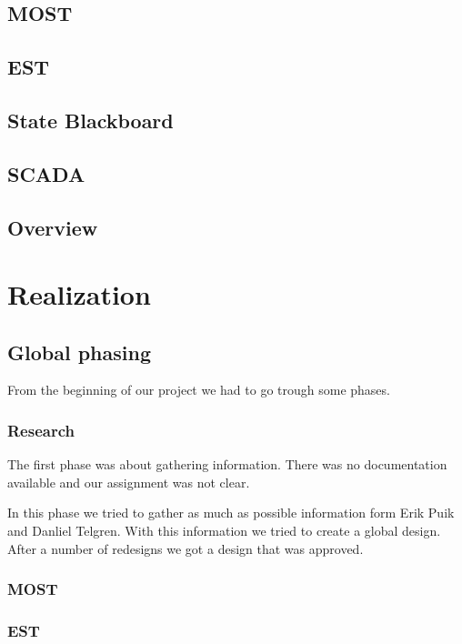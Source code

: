 \documentclass[12pt,a4paper]{report}
\begin{document}
\section{MOST}

\section{EST}

\section{State Blackboard}

\section{SCADA}

\section{Overview}

\chapter{Realization}
\section{Global phasing}
From the beginning of our project we had to go trough some phases.

\subsection{Research}
The first phase was about gathering information.
There was no documentation available and our assignment was not clear.

In this phase we tried to gather as much as possible information form Erik Puik and Danliel Telgren.
With this information we tried to create a global design.
After a number of redesigns we got a design that was approved.

\subsection{MOST}


\subsection{EST}
\end{document}
